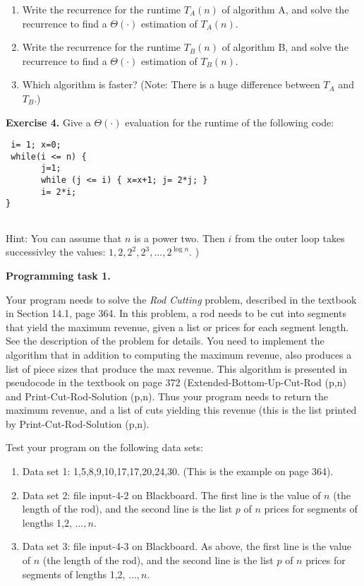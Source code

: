 \documentclass[11pt]{article}
\begin{document}
\begin{enumerate}
\item Write the recurrence for the runtime $T_A(n)$ of algorithm A, and solve the recurrence to find a $\Theta( \cdot)$ estimation of $T_A(n)$.
\item Write the recurrence for the runtime $T_B(n)$ of algorithm B, and solve the recurrence to find a $\Theta( \cdot)$ estimation of $T_B(n)$.
\item Which algorithm is faster? (Note: There is a huge difference between $T_A$ and $T_B$.)
\end{enumerate}
\bigskip

\textbf{Exercise 4.}
Give a  $\Theta( \cdot)$ evaluation for the runtime of the following code:
\begin{verbatim}
 i= 1; x=0;
 while(i <= n) {
       j=1;
       while (j <= i) { x=x+1; j= 2*j; }
       i= 2*i;
}    


\end{verbatim}
Hint:  You can assume that $n$ is a power two.  Then $i$ from the outer loop takes successivley the values: $1, 2, 2^2, 2^3, ..., 2^{\log n}$. )
\newpage

\textbf{Programming task 1.}

Your program needs to solve the  \emph{Rod Cutting} problem, described in the textbook in Section 14.1, page 364.  In this problem, a rod needs to be cut into segments that yield the maximum revenue, given a list or prices for each segment length. See the description of the problem for details.  You need to implement the algorithm that in addition to computing the maximum revenue, also produces a list of piece sizes that produce the  max revenue. This algorithm is presented in pseudocode in the textbook on page 372 (\textsf{Extended-Bottom-Up-Cut-Rod (p,n)} and \textsf{Print-Cut-Rod-Solution (p,n)}. Thus your program needs to return the maximum revenue, and a list of cuts yielding this revenue (this is the list printed by \textsf{Print-Cut-Rod-Solution (p,n)}.

Test your program on the following data sets:
\begin{enumerate}
\item Data set 1: 1,5,8,9,10,17,17,20,24,30. (This is the example on page 364).
\item Data set 2: file input-4-2 on Blackboard. The first line is the value of $n$ (the length of the rod), and the second line is the list $p$ of $n$ prices for segments of lengths 1,2, $\ldots, n$.
\item Data set 3: file input-4-3 on Blackboard. As above, the first line is the value of $n$ (the length of the rod), and the second line is the list $p$  of $n$ prices for segments of lengths 1,2, $\ldots, n$.
\end{enumerate}
\end{document}

